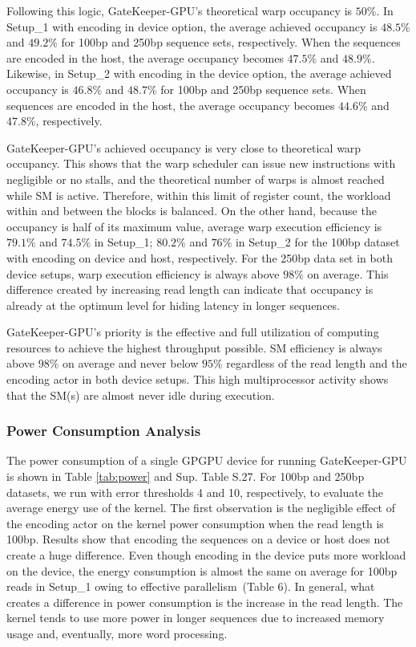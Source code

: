 Following this logic, GateKeeper-GPU's theoretical warp occupancy is $50\%$.  In Setup\_1 with encoding in device option, the average achieved occupancy is $48.5\%$ and $49.2\%$ for 100bp and 250bp sequence sets, respectively. When the sequences are encoded in the host, the average occupancy becomes $47.5\%$ and $48.9\%$. Likewise, in Setup\_2 with encoding in the device option, the average achieved occupancy is $46.8\%$ and $48.7\%$ for 100bp and 250bp sequence sets. When sequences are encoded in the host, the average occupancy becomes $44.6\%$ and $47.8\%$, respectively. 

GateKeeper-GPU's achieved occupancy is very close to theoretical warp occupancy. This shows that the warp scheduler can issue new instructions with negligible or no stalls, and the theoretical number of warps is almost reached while SM is active. Therefore, within this limit of register count, the workload within and between the blocks is balanced. On the other hand, because the occupancy is half of its maximum value, average warp execution efficiency is $79.1\%$ and $74.5\%$ in Setup\_1; $80.2\%$ and $76\%$ in Setup\_2 for the 100bp dataset with encoding on device and host, respectively. For the 250bp data set in both device setups, warp execution efficiency is always above $98\%$ on average. This difference created by increasing read length can indicate that occupancy is already at the optimum level for hiding latency in longer sequences.  

GateKeeper-GPU's priority is the effective and full utilization of computing resources to achieve the highest throughput possible. SM efficiency is always above $98\%$ on average and never below $95\%$ regardless of the read length and the encoding actor in both device setups. This high multiprocessor activity shows that the SM(s) are almost never idle during execution. 
\subsubsection{Power Consumption Analysis}
The power consumption of a single GPGPU device for running GateKeeper-GPU is shown in Table \ref{tab:power} and Sup. Table S.27. For 100bp and 250bp datasets, we run with error thresholds 4 and 10, respectively, to evaluate the average energy use of the kernel. The first observation is the negligible effect of the encoding actor on the kernel power consumption when the read length is 100bp. Results show that encoding the sequences on a device or host does not create a huge difference. Even though encoding in the device puts more workload on the device, the energy consumption is almost the same on average for 100bp reads in Setup\_1  owing to effective parallelism~(Table 6). In general, what creates a difference in power consumption is the increase in the read length. The kernel tends to use more power in longer sequences due to increased memory usage and, eventually, more word processing.



